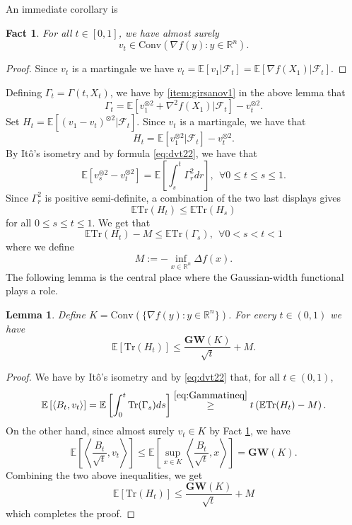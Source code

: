 \documentclass[12pt]{article}
\def \RR {\mathbb R}
\def \EE {\mathbb E}
\def \FF {\mathcal{F}}
\def \tr {\mathrm{Tr}}
\def \MW {\mathbf{GW}}
\newtheorem{lemma}[theorem]{Lemma}
\newtheorem{fact}[theorem]{Fact}
\theoremstyle{definition}
\theoremstyle{remark}
\begin{document}
An immediate corollary is
\begin{fact} \label{fact:vtink}
For all $t \in [0,1]$, we have almost surely
\begin{equation}\label{eq:vtinconvhull}
v_t \in \mathrm{Conv}(\nabla f(y): y \in \RR^n). 
\end{equation}
\end{fact}
\begin{proof}
Since $v_t$ is a martingale we have $v_t = \EE[v_1 | \FF_t] = \EE[\nabla f(X_1) | \FF_t]$.
\end{proof}
Defining $\Gamma_t = \Gamma(t,X_t)$, we have by \ref{item:girsanov1} in the above lemma that
$$
\Gamma_t = \EE[v_1^{\otimes 2} + \nabla^2 f(X_1) | \FF_t] - v_t^{\otimes 2}.
$$
Set $H_t = \EE[(v_1 - v_t)^{\otimes 2} | \FF_t]$. Since $v_t$ is a martingale, we have that 
$$
H_t = \EE[v_1^{\otimes 2} | \FF_t] - v_t^{\otimes 2}.
$$
By It\^{o}'s isometry and by formula \eqref{eq:dvt22}, we have that 
$$
\EE \left [v_s^{\otimes 2} - v_t^{\otimes 2} \right ] = \EE \left [\int_s^t \Gamma_r^2 dr \right ], ~~ \forall 0 \leq t \leq s \leq 1.    
$$
Since $\Gamma_r^2$ is positive semi-definite, a combination of the two last displays gives
$$
\EE \tr (H_t) \leq \EE \tr (H_s)
$$
for all $0 \leq s \leq t \leq 1$. We get that
\begin{equation}\label{eq:Gammatineq}
\EE \tr (H_t) - M \leq \EE \tr (\Gamma_s), ~~ \forall 0 < s < t < 1
\end{equation}
where we define
$$
M := - \inf_{x \in \RR^n} \Delta f(x).
$$
The following lemma is the central place where the Gaussian-width functional plays a role. 
\begin{lemma} \label{lem:mwGauss}
Define $K = \mathrm{Conv}(\{ \nabla f(y): y \in \RR^n\} )$. For every $t \in (0,1)$ we have
$$
\EE [\tr(H_t)] \leq \frac{\MW(K)}{ \sqrt{t}} + M.
$$
\end{lemma}
\begin{proof}
We have by It\^{o}'s isometry and by \eqref{eq:dvt22} that, for all $t \in (0,1)$,
$$
\EE \left [ \langle B_{t}, v_{t} \rangle \right ] = \EE \left [ \int_0^{t} \tr(\Gamma_s) ds \right] \stackrel{ \eqref{eq:Gammatineq}}{\geq} t \left (\EE \tr(H_t) - M \right ).
$$
On the other hand, since almost surely $v_t \in K$ by Fact \ref{fact:vtink}, we have
$$
\EE \left [ \left  \langle \frac{B_t}{\sqrt t},  v_t \right \rangle \right  ] \leq \EE \left [ \sup_{x \in K} \left \langle \frac{B_t}{\sqrt t}, x \right \rangle \right ] = \MW(K). 
$$
Combining the two above inequalities, we get
$$
\EE [\tr(H_t)] \leq \frac{\MW(K)}{ \sqrt{t}} + M
$$
which completes the proof.
\end{proof}
\end{document}
